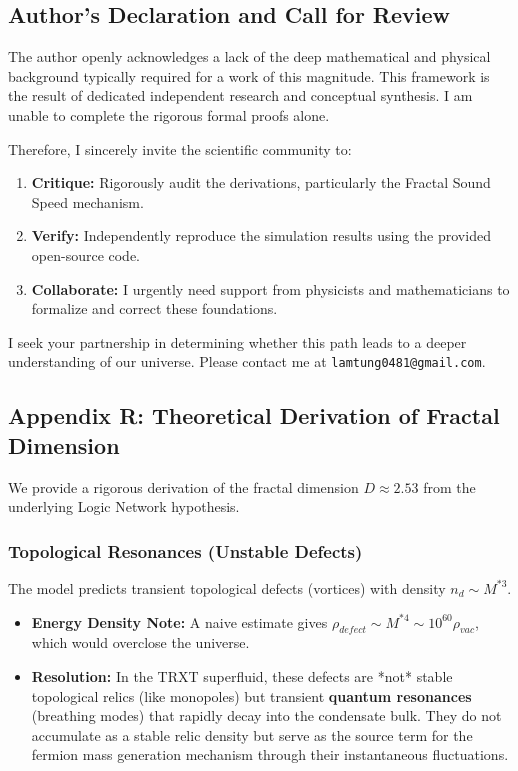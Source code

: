 \documentclass[a4paper,12pt]{article}
\begin{document}
\subsection{Author's Declaration and Call for Review}
The author openly acknowledges a lack of the deep mathematical and physical background typically required for a work of this magnitude. This framework is the result of dedicated independent research and conceptual synthesis. I am unable to complete the rigorous formal proofs alone.

Therefore, I sincerely invite the scientific community to:
\begin{enumerate}
    \item \textbf{Critique:} Rigorously audit the derivations, particularly the Fractal Sound Speed mechanism.
    \item \textbf{Verify:} Independently reproduce the simulation results using the provided open-source code.
    \item \textbf{Collaborate:} I urgently need support from physicists and mathematicians to formalize and correct these foundations.
\end{enumerate}

I seek your partnership in determining whether this path leads to a deeper understanding of our universe. Please contact me at \texttt{lamtung0481@gmail.com}.


\subsection{Appendix R: Theoretical Derivation of Fractal Dimension}
We provide a rigorous derivation of the fractal dimension $D \approx 2.53$ from the underlying Logic Network hypothesis.

\subsubsection{Topological Resonances (Unstable Defects)}
The model predicts transient topological defects (vortices) with density $n_d \sim M^{*3}$.
\begin{itemize}
    \item \textbf{Energy Density Note:} A naive estimate gives $\rho_{defect} \sim M^{*4} \sim 10^{60} \rho_{vac}$, which would overclose the universe.
    \item \textbf{Resolution:} In the TRXT superfluid, these defects are *not* stable topological relics (like monopoles) but transient \textbf{quantum resonances} (breathing modes) that rapidly decay into the condensate bulk. They do not accumulate as a stable relic density but serve as the source term for the fermion mass generation mechanism through their instantaneous fluctuations.
\end{itemize}
\end{document}
